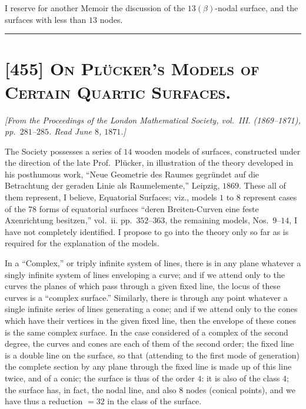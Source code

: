 \documentclass[11pt,a4paper]{article}
\begin{document}
\medskip

I reserve for another Memoir the discussion of the $13(\beta)$-nodal
surface, and the surfaces with less than $13$ nodes.

\bigskip
\hrule
\bigskip

\section*{[455] \textsc{On Pl\"ucker's Models of Certain Quartic Surfaces.}}

\begin{center}
\textit{[From the Proceedings of the London Mathematical Society, vol.\ III.
(1869--1871), pp.\ $281$--$285$. Read June $8$, $1871$.]}
\end{center}

\medskip

The Society possesses a series of $14$ wooden models of surfaces,
constructed under the direction of the late Prof.~Pl\"ucker, in
illustration of the theory developed in his posthumous work, ``Neue
Geometrie des Raumes gegr\"undet auf die Betrachtung der geraden Linie
als Raumelemente,'' Leipzig, $1869$. These all of them represent, I
believe, Equatorial Surfaces; viz., models $1$ to $8$ represent cases of
the $78$ forms of equatorial surfaces ``deren Breiten-Curven eine feste
Axenrichtung besitzen,'' vol.~ii. pp.~$352$--$363$, the remaining models,
Nos.~$9$--$14$, I have not completely identified. I propose to go into
the theory only so far as is required for the explanation of the models.

\medskip

In a ``Complex,'' or triply infinite system of lines, there is in any
plane whatever a singly infinite system of lines enveloping a curve; and
if we attend only to the curves the planes of which pass through a given
fixed line, the locus of these curves is a ``complex surface.''
Similarly, there is through any point whatever a single infinite series
of lines generating a cone; and if we attend only to the cones which have
their vertices in the given fixed line, then the envelope of these cones
is the same complex surface. In the case considered of a complex of the
second degree, the curves and cones are each of them of the second order;
the fixed line is a double line on the surface, so that (attending to the
first mode of generation) the complete section by any plane through the
fixed line is made up of this line twice, and of a conic; the surface is
thus of the order $4$: it is also of the class $4$; the surface has, in
fact, the nodal line, and also $8$ nodes (conical points), and we have
thus a reduction $= 32$ in the class of the surface.
\end{document}
